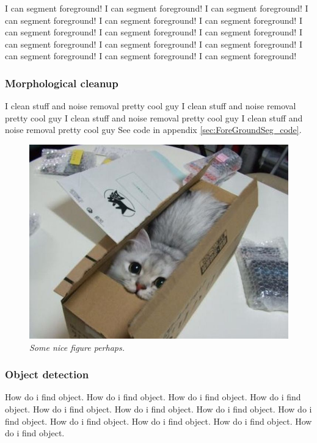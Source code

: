 I can segment foreground! I can segment foreground! I can segment foreground! I can segment foreground! I can segment foreground! I can segment foreground! I can segment foreground! I can segment foreground! I can segment foreground! I can segment foreground! I can segment foreground! I can segment foreground! I can segment foreground! I can segment foreground! I can segment foreground! 

\subsubsection{Morphological cleanup}
I clean stuff and noise removal pretty cool guy
I clean stuff and noise removal pretty cool guy
I clean stuff and noise removal pretty cool guy
I clean stuff and noise removal pretty cool guy
See code in appendix \ref{sec:ForeGroundSeg_code}. %

\begin{figure}[htb]
	\centering
	\includegraphics[width=\linewidth]{images/acatisfinetoo}
	\caption{\textit{Some nice figure perhaps.}}
	\label{fig:foreground_segmentation_fig} %
\end{figure}

\subsubsection{Object detection}
How do i find object. How do i find object. How do i find object. How do i find object.
How do i find object. How do i find object. How do i find object. How do i find object. 
How do i find object. How do i find object. How do i find object. How do i find object. 
